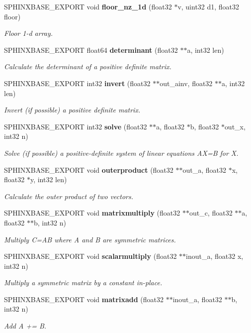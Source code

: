 \begin{DoxyCompactItemize}
S\+P\+H\+I\+N\+X\+B\+A\+S\+E\+\_\+\+E\+X\+P\+O\+R\+T void {\bf floor\+\_\+nz\+\_\+1d} (float32 $\ast$v, uint32 d1, float32 floor)
\begin{DoxyCompactList}\small\item\em Floor 1-\/d array. \end{DoxyCompactList}\item 
S\+P\+H\+I\+N\+X\+B\+A\+S\+E\+\_\+\+E\+X\+P\+O\+R\+T float64 {\bf determinant} (float32 $\ast$$\ast$a, int32 len)
\begin{DoxyCompactList}\small\item\em Calculate the determinant of a positive definite matrix. \end{DoxyCompactList}\item 
S\+P\+H\+I\+N\+X\+B\+A\+S\+E\+\_\+\+E\+X\+P\+O\+R\+T int32 {\bf invert} (float32 $\ast$$\ast$out\+\_\+ainv, float32 $\ast$$\ast$a, int32 len)
\begin{DoxyCompactList}\small\item\em Invert (if possible) a positive definite matrix. \end{DoxyCompactList}\item 
S\+P\+H\+I\+N\+X\+B\+A\+S\+E\+\_\+\+E\+X\+P\+O\+R\+T int32 {\bf solve} (float32 $\ast$$\ast$a, float32 $\ast$b, float32 $\ast$out\+\_\+x, int32 n)
\begin{DoxyCompactList}\small\item\em Solve (if possible) a positive-\/definite system of linear equations A\+X=B for X. \end{DoxyCompactList}\item 
S\+P\+H\+I\+N\+X\+B\+A\+S\+E\+\_\+\+E\+X\+P\+O\+R\+T void {\bf outerproduct} (float32 $\ast$$\ast$out\+\_\+a, float32 $\ast$x, float32 $\ast$y, int32 len)
\begin{DoxyCompactList}\small\item\em Calculate the outer product of two vectors. \end{DoxyCompactList}\item 
S\+P\+H\+I\+N\+X\+B\+A\+S\+E\+\_\+\+E\+X\+P\+O\+R\+T void {\bf matrixmultiply} (float32 $\ast$$\ast$out\+\_\+c, float32 $\ast$$\ast$a, float32 $\ast$$\ast$b, int32 n)
\begin{DoxyCompactList}\small\item\em Multiply C=A\+B where A and B are symmetric matrices. \end{DoxyCompactList}\item 
S\+P\+H\+I\+N\+X\+B\+A\+S\+E\+\_\+\+E\+X\+P\+O\+R\+T void {\bf scalarmultiply} (float32 $\ast$$\ast$inout\+\_\+a, float32 x, int32 n)
\begin{DoxyCompactList}\small\item\em Multiply a symmetric matrix by a constant in-\/place. \end{DoxyCompactList}\item 
S\+P\+H\+I\+N\+X\+B\+A\+S\+E\+\_\+\+E\+X\+P\+O\+R\+T void {\bf matrixadd} (float32 $\ast$$\ast$inout\+\_\+a, float32 $\ast$$\ast$b, int32 n)
\begin{DoxyCompactList}\small\item\em Add A += B. \end{DoxyCompactList}\end{DoxyCompactItemize}


